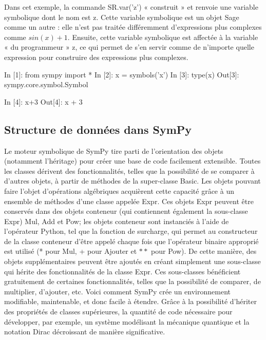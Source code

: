 Dans cet exemple, la commande SR.var(’z’) « construit » et renvoie une variable symbolique dont le nom est z. Cette variable symbolique est un objet Sage comme un autre : elle n’est pas traitée différemment d’expressions plus complexes comme $sin(x) + 1$. Ensuite, cette variable symbolique est affectée à la variable « du programmeur » z, ce qui permet de s’en servir comme de n’importe quelle expression pour construire des expressions plus complexes.


\begin{python}
In [1]: from sympy import *
In [2]: x = symbols('x')                                                                     
In [3]: type(x)
Out[3]: sympy.core.symbol.Symbol
\end{python}

\begin{python}
In [4]: x+3                                                                     
Out[4]: x + 3
\end{python}

\subsection{Structure de données dans SymPy}
Le moteur symbolique de SymPy tire parti de l'orientation des objets (notamment l'héritage) pour créer une base de code facilement extensible. Toutes les classes dérivent des fonctionnalités, telles que la possibilité de se comparer à d'autres objets, à partir de méthodes de la super-classe Basic. Les objets pouvant faire l'objet d'opérations algébriques acquièrent cette capacité grâce à un ensemble de méthodes d'une classe appelée Expr. Ces objets Expr peuvent être conservés dans des objets conteneur (qui contiennent également la sous-classe Expr) Mul, Add et Pow; les objets conteneur sont instanciés à l'aide de l'opérateur Python, tel que la fonction de surcharge, qui permet au constructeur de la classe conteneur d'être appelé chaque fois que l'opérateur binaire approprié est utilisé (* pour Mul, + pour Ajouter et $**$ pour Pow).
De cette manière, des objets supplémentaires peuvent être ajoutés en créant simplement une sous-classe qui hérite des fonctionnalités de la classe Expr. Ces sous-classes bénéficient gratuitement de certaines fonctionnalités, telles que la possibilité de comparer, de multiplier, d’ajouter, etc. Voici comment SymPy crée un environnement modifiable, maintenable, et donc facile à étendre. Grâce à la possibilité d'hériter des propriétés de classes supérieures, la quantité de code nécessaire pour développer, par exemple, un système modélisant la mécanique quantique et la notation Dirac décroissant de manière significative.

